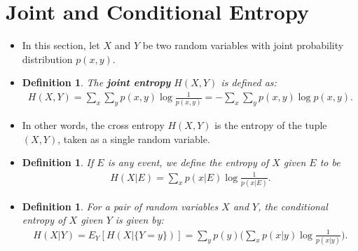 \documentclass[10pt]{article}
\newtheorem{definition}[lemma]{Definition}
\begin{document}
  \section{Joint and Conditional Entropy}

  \begin{itemize}
  	\item In this section, let $X$ and $Y$ be two random variables with joint probability distribution $p(x,y)$.

  	\item \begin{definition}
  		The \textbf{joint entropy} $H(X,Y)$ is defined as:
  		\begin{align*}
  			H(X,Y) 
  			= \sum_{x} \sum_{y} p(x,y) \log \frac{1}{p(x,y)}
  			= -\sum_{x} \sum_{y} p(x,y) \log p(x,y).
  		\end{align*}
  	\end{definition}

  	\item In other words, the cross entropy $H(X,Y)$ is the entropy of the tuple $(X,Y)$, taken as a single random variable.

  	\item \begin{definition}
  		If $E$ is any event, we define the entropy of $X$ given $E$ to be
  		\begin{align*}
  			H(X|E) = \sum_{x} p(x|E) \log \frac{1}{p(x|E)}.
  		\end{align*}
  	\end{definition}

  	\item \begin{definition}
  		For a pair of random variables $X$ and $Y$, the conditional entropy of $X$ given $Y$ is given by:
  		\begin{align*}
  			H(X|Y) 
  			= E_Y[H(X|\{Y = y\})]
  			= \sum_{y} p(y) \bigg( \sum_{x} p(x|y) \log \frac{1}{p(x|y)}\bigg).
  		\end{align*}
  	\end{definition}


\end{itemize}
\end{document}

